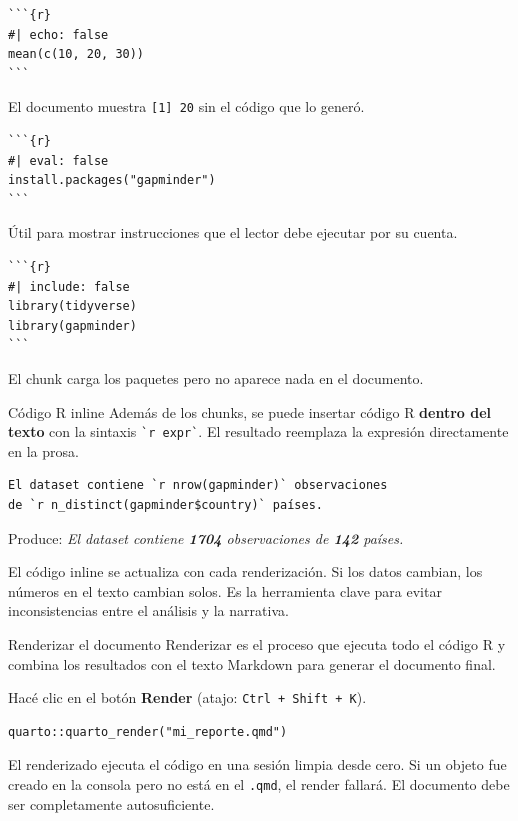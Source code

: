 \documentclass[8pt]{beamer}
\begin{document}
	\begin{frame}[fragile]
\begin{lstlisting}
```{r}
#| echo: false
mean(c(10, 20, 30))
```
\end{lstlisting}
		El documento muestra \texttt{[1] 20} sin el código que lo generó.

\begin{lstlisting}
```{r}
#| eval: false
install.packages("gapminder")
```
\end{lstlisting}
		Útil para mostrar instrucciones que el lector debe ejecutar por su cuenta.

\begin{lstlisting}
```{r}
#| include: false
library(tidyverse)
library(gapminder)
```
\end{lstlisting}
		El chunk carga los paquetes pero no aparece nada en el documento.
	\end{frame}


	\begin{frame}[fragile]{Código R inline}
		Además de los chunks, se puede insertar código R \textbf{dentro del texto} con la sintaxis \verb|`r expr`|. El resultado reemplaza la expresión directamente en la prosa.

\begin{lstlisting}
El dataset contiene `r nrow(gapminder)` observaciones
de `r n_distinct(gapminder$country)` países.
\end{lstlisting}

		Produce: \textit{El dataset contiene \textbf{1704} observaciones de \textbf{142} países.}

		\begin{exampleblock}{}
			El código inline se actualiza con cada renderización. Si los datos cambian, los números en el texto cambian solos. Es la herramienta clave para evitar inconsistencias entre el análisis y la narrativa.
		\end{exampleblock}
	\end{frame}


	\begin{frame}[fragile]{Renderizar el documento}
		Renderizar es el proceso que ejecuta todo el código R y combina los resultados con el texto Markdown para generar el documento final.

		Hacé clic en el botón \textbf{Render} (atajo: \verb|Ctrl + Shift + K|).

\begin{lstlisting}[style=RScript]
quarto::quarto_render("mi_reporte.qmd")
\end{lstlisting}

		\begin{alertblock}{}
			El renderizado ejecuta el código en una sesión limpia desde cero. Si un objeto fue creado en la consola pero no está en el \texttt{.qmd}, el render fallará. El documento debe ser completamente autosuficiente.
		\end{alertblock}
	\end{frame}
\end{document}

